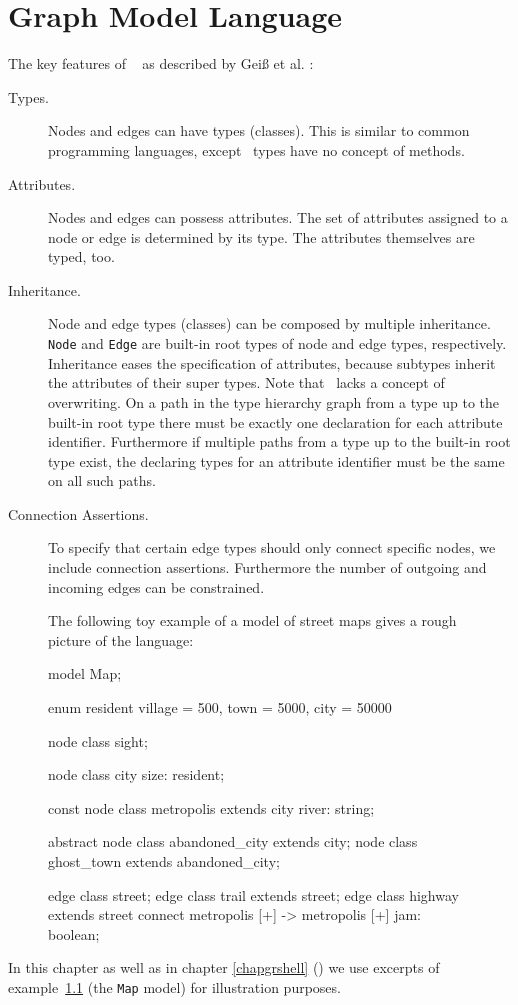 \chapter{Graph Model Language}
\label{chapmodellang}
The key features of \GrG\  as described by Geiß et al. \cite{GBGHS:06}:

\begin{description}
\item[Types.] Nodes and edges can have types (classes). This is similar to common programming languages, except \GrG\ types have no concept of methods. 
\item[Attributes.] Nodes and edges can possess attributes. The set of attributes assigned to a node or edge is determined by its type. The attributes themselves are typed, too.
\item[Inheritance.] Node and edge types (classes) can be composed by multiple inheritance. \texttt{Node} and \texttt{Edge} are built-in root types of node and edge types, respectively. Inheritance eases the specification of attributes, because subtypes inherit the attributes of their super types. Note that \GrG\ lacks a concept of overwriting. On a path in the type hierarchy graph from a type up to the built-in root type there must be exactly one declaration for each attribute identifier. Furthermore if multiple paths from a type up to the built-in root type exist, the declaring types for an attribute identifier must be the same on all such paths.
\item[Connection Assertions.] To specify that certain edge types should only connect specific nodes, we include connection assertions. Furthermore the number of outgoing and incoming edges can be constrained.
\end{description}

\begin{figure}[htbf]
\begin{example}\label{ex:model:map}
The following toy example of a model of street maps gives a rough picture of the language:
\begin{grgen}
model Map;

enum resident {village = 500, town = 5000, city = 50000}

node class sight;

node class city {
	size: resident;
}

const node class metropolis extends city {
  river: string;
}  

abstract node class abandoned_city extends city;
node class ghost_town extends abandoned_city;

edge class street;
edge class trail extends street;
edge class highway extends street
    connect metropolis [+] -> metropolis [+]
{
    jam: boolean;
}
\end{grgen}
\end{example}
\end{figure}
In this chapter as well as in chapter \ref{chapgrshell} (\GrShell) we use excerpts of example~\ref{ex:model:map} (the \texttt{Map} model) for illustration purposes.
